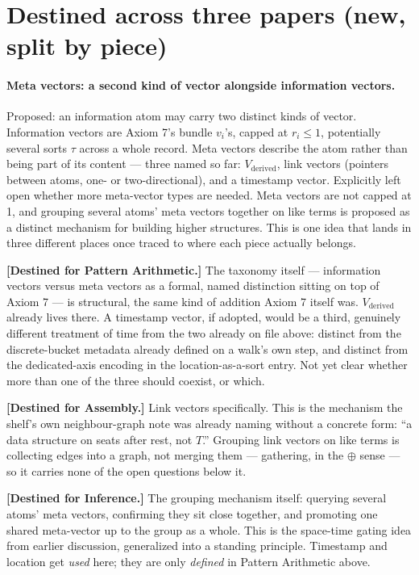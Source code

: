 \documentclass[11pt]{article}
\begin{document}
\section{Destined across three papers (new, split by piece)}

\paragraph{Meta vectors: a second kind of vector alongside information
vectors.} Proposed: an information atom may carry two distinct kinds
of vector. Information vectors are Axiom 7's bundle $v_i$'s, capped at
$r_i\le1$, potentially several sorts $\tau$ across a whole record.
Meta vectors describe the atom rather than being part of its content
--- three named so far: $V_{\text{derived}}$, link vectors (pointers
between atoms, one- or two-directional), and a timestamp vector.
Explicitly left open whether more meta-vector types are needed. Meta
vectors are not capped at 1, and grouping several atoms' meta vectors
together on like terms is proposed as a distinct mechanism for
building higher structures. This is one idea that lands in three
different places once traced to where each piece actually belongs.

\textbf{[Destined for Pattern Arithmetic.]} The taxonomy itself ---
information vectors versus meta vectors as a formal, named distinction
sitting on top of Axiom 7 --- is structural, the same kind of addition
Axiom 7 itself was. $V_{\text{derived}}$ already lives there. A
timestamp vector, if adopted, would be a third, genuinely different
treatment of time from the two already on file above: distinct from
the discrete-bucket metadata already defined on a walk's own step, and
distinct from the dedicated-axis encoding in the location-as-a-sort
entry. Not yet clear whether more than one of the three should
coexist, or which.

\textbf{[Destined for Assembly.]} Link vectors specifically. This is
the mechanism the shelf's own neighbour-graph note was already naming
without a concrete form: ``a data structure on seats after rest, not
$T$.'' Grouping link vectors on like terms is collecting edges into a
graph, not merging them --- gathering, in the $\oplus$ sense --- so
it carries none of the open questions below it.

\textbf{[Destined for Inference.]} The grouping mechanism itself:
querying several atoms' meta vectors, confirming they sit close
together, and promoting one shared meta-vector up to the group as a
whole. This is the space-time gating idea from earlier discussion,
generalized into a standing principle. Timestamp and location get
\emph{used} here; they are only \emph{defined} in Pattern Arithmetic
above.
\end{document}
